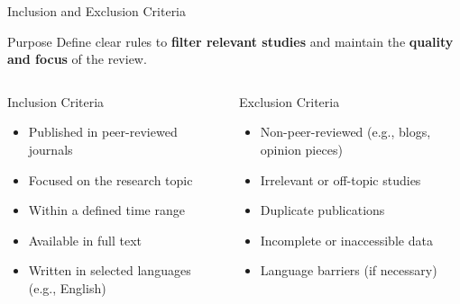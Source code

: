 \begin{frame}{Inclusion and Exclusion Criteria}
  \begin{block}{Purpose}
    \small
    Define clear rules to \textbf{filter relevant studies} and maintain the \textbf{quality and focus} of the review.
  \end{block}

  \pause

  \begin{columns}[T]
    \begin{block}{Inclusion Criteria}
      \begin{itemize}
        \item Published in peer-reviewed journals
        \item Focused on the research topic
        \item Within a defined time range
        \item Available in full text
        \item Written in selected languages (e.g., English)
      \end{itemize}
    \end{block}

    \hspace{0.5cm}

    \begin{block}{Exclusion Criteria}
      \begin{itemize}
        \item Non-peer-reviewed (e.g., blogs, opinion pieces)
        \item Irrelevant or off-topic studies
        \item Duplicate publications
        \item Incomplete or inaccessible data
        \item Language barriers (if necessary)
      \end{itemize}
    \end{block}
  \end{columns}
\end{frame}

